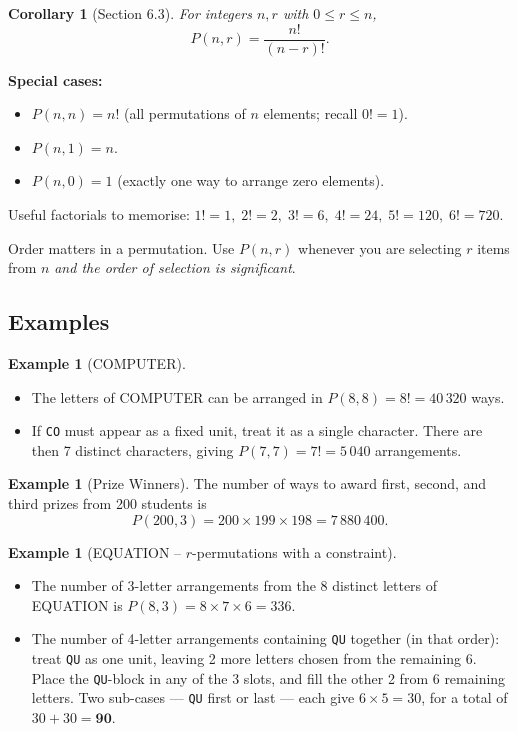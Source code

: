 \documentclass[11pt, a4paper, notitlepage]{report}
\newtheorem{corollary}[theorem]{Corollary}
\theoremstyle{definition}
\newtheorem{example}[theorem]{Example}
\theoremstyle{remark}
\begin{document}
\begin{corollary}[Section 6.3]
\label{cor:pnr-factorial}
For integers $n, r$ with $0 \leq r \leq n$,
\[
  P(n,r) = \frac{n!}{(n-r)!}.
\]
\end{corollary}

\textbf{Special cases:}
\begin{itemize}
  \item $P(n,n) = n!$ \quad (all permutations of $n$ elements; recall $0! = 1$).
  \item $P(n,1) = n$.
  \item $P(n,0) = 1$ (exactly one way to arrange zero elements).
\end{itemize}

Useful factorials to memorise: $1!=1,\; 2!=2,\; 3!=6,\; 4!=24,\; 5!=120,\; 6!=720$.

\begin{keyresult}[title={Key Result: $P(n,r) = n!/(n-r)!$}]
Order matters in a permutation. Use $P(n,r)$ whenever you are selecting $r$ items from $n$
\emph{and the order of selection is significant}.
\end{keyresult}

\subsection{Examples}

\begin{example}[COMPUTER]
\begin{itemize}
  \item[(i)] The letters of \textsc{COMPUTER} can be arranged in $P(8,8) = 8! = 40\,320$ ways.
  \item[(ii)] If \texttt{CO} must appear as a fixed unit, treat it as a single character. There
              are then 7 distinct characters, giving $P(7,7) = 7! = 5\,040$ arrangements.
\end{itemize}
\end{example}

\begin{example}[Prize Winners]
The number of ways to award first, second, and third prizes from 200 students is
\[
  P(200, 3) = 200 \times 199 \times 198 = 7\,880\,400.
\]
\end{example}

\begin{example}[EQUATION -- $r$-permutations with a constraint]
\begin{itemize}
  \item[(i)] The number of 3-letter arrangements from the 8 distinct letters of \textsc{EQUATION}
             is $P(8,3) = 8 \times 7 \times 6 = 336$.
  \item[(ii)] The number of 4-letter arrangements containing \texttt{QU} together (in that order):
              treat \texttt{QU} as one unit, leaving 2 more letters chosen from the remaining 6.
              Place the \texttt{QU}-block in any of the 3 slots, and fill the other 2 from 6
              remaining letters. Two sub-cases --- \texttt{QU} first or last --- each give $6 \times 5 = 30$,
              for a total of $30 + 30 = \mathbf{90}$.
\end{itemize}
\end{example}
\end{document}
